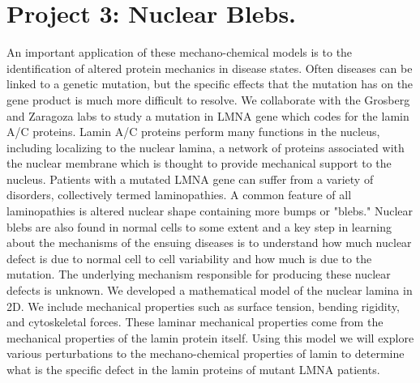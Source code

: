 \documentclass[11pt]{amsart}
\begin{document}
\section*{Project 3: Nuclear Blebs.}
An important application of these mechano-chemical models is to the identification of altered protein mechanics in disease states. Often diseases can be linked to a genetic mutation, but the specific effects that the mutation has on the gene product is much more difficult to resolve. We collaborate with the Grosberg and Zaragoza labs to study a mutation in LMNA gene which codes for the lamin A/C proteins. Lamin A/C proteins perform many functions in the nucleus, including localizing to the nuclear lamina, a network of proteins associated with the nuclear membrane which is thought to provide mechanical support to the nucleus. Patients with a mutated LMNA gene can suffer from a variety of disorders, collectively termed laminopathies. A common feature of all laminopathies is altered nuclear shape containing more bumps or "blebs." Nuclear blebs are also found in normal cells to some extent and a key step in learning about the mechanisms of the ensuing diseases is to understand how much nuclear defect is due to normal cell to cell variability and how much is due to the mutation. The underlying mechanism responsible for producing these nuclear defects is unknown. We developed a mathematical model of the nuclear lamina in 2D. We include mechanical properties such as surface tension, bending rigidity, and cytoskeletal forces. These laminar mechanical properties come from the mechanical properties of the lamin protein itself. Using this model we will explore various perturbations to the mechano-chemical properties of lamin to determine what is the specific defect in the lamin proteins of mutant LMNA patients.
\end{document}
